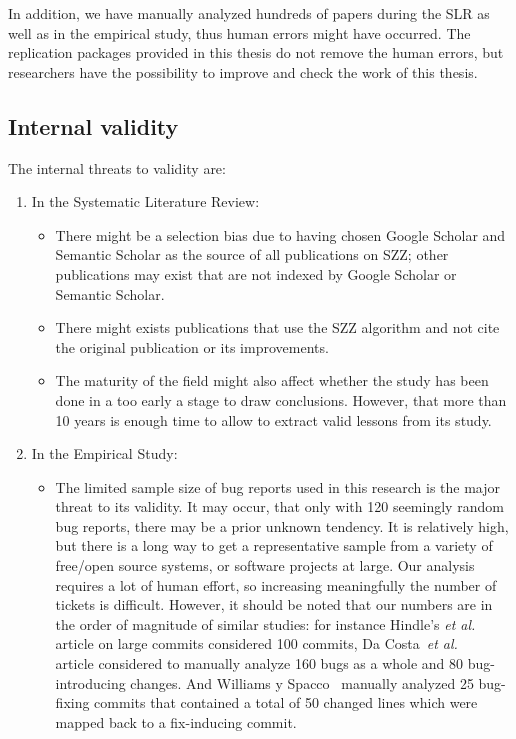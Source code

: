 \documentclass[a4paper, 12pt]{book}
\begin{document}
In addition, we have manually analyzed hundreds of papers during the SLR as well as in the empirical study, thus human errors might have occurred. The replication packages provided in this thesis do not remove the human errors, but researchers have the possibility to improve and check the work of this thesis. 

\subsection{Internal validity}
The internal threats to validity are:

\begin{enumerate}
	\item In the Systematic Literature Review: 
		\begin{itemize}
   		 	\item  There might be a selection bias due to having chosen Google Scholar and Semantic Scholar as the source of all publications on SZZ; other publications may exist that are not indexed by Google Scholar or Semantic Scholar. 
    			\item  There might exists publications that use the SZZ algorithm and not cite the original publication or its improvements. 
    		 	\item The maturity of the field might also affect whether the study has been done in a too early a stage to draw conclusions. However, that more than 10 years is enough time to allow to extract valid lessons from its study.
		\end{itemize}
	\item {In the Empirical Study}: 
		\begin{itemize}
   			\item The limited sample size of bug reports used in this research is the major threat to its validity. It may occur, that only with 120 seemingly random bug reports, there may be a prior unknown tendency. It is relatively high, but there is a long way to get a representative sample from a variety of free/open source systems, or software projects at large. Our analysis requires a lot of human effort, so increasing meaningfully the number of tickets is difficult. However, it should be noted that our numbers are in the order of magnitude of similar studies: for instance Hindle's \emph{et al.} ~\cite{hindle2008large} article on large commits considered 100 commits, Da Costa~\textit{et al.} ~\cite{da2016framework} article considered to manually analyze 160 bugs as a whole and 80 bug-introducing changes. And Williams y Spacco~\cite{williams2008szz} manually analyzed 25 bug-fixing commits that contained a total of 50 changed lines which were mapped back to a fix-inducing commit.

\end{itemize}
\end{enumerate}
\end{document}
